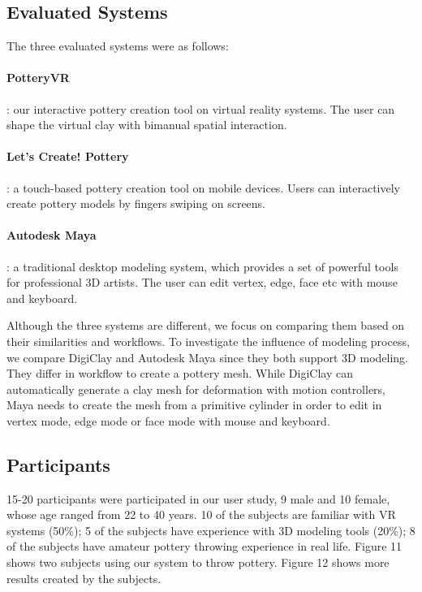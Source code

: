 \subsection{Evaluated Systems}
\label{sec:6.1}
The three evaluated systems were as follows:

\paragraph{PotteryVR}: our interactive pottery creation tool on virtual reality systems. The user can shape the virtual clay with bimanual spatial interaction.
\paragraph{Let’s Create! Pottery}: a touch-based pottery creation tool on mobile devices. Users can interactively create pottery models by fingers swiping on screens.\cite{website:letspottery}
\paragraph{Autodesk Maya}: a traditional desktop modeling system, which provides a set of powerful tools for professional 3D artists. The user can edit vertex, edge, face etc with mouse and keyboard.

Although the three systems are different, we focus on comparing them based on their similarities and workflows.
To investigate the influence of modeling process, we compare DigiClay and Autodesk Maya since they both support 3D modeling. They differ in workflow to create a pottery mesh. While DigiClay can automatically generate a clay mesh for deformation with motion controllers, Maya needs to create the mesh from a primitive cylinder in order to edit in vertex mode, edge mode or face mode with mouse and keyboard. 

\subsection{Participants}
\label{sec:6.2}
15-20 participants were participated in our user study, 9 male and 10 female, whose age ranged from 22 to 40 years. 10 of the subjects are familiar with VR systems (50\%); 5 of the subjects have experience with 3D modeling tools (20\%); 8 of the subjects have amateur pottery throwing experience in real life.
Figure 11 shows two subjects using our system to throw pottery. Figure 12 shows more results created by the subjects.

